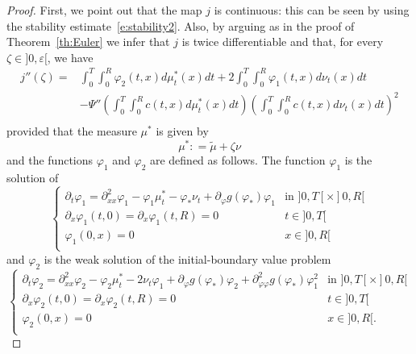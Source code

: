 \documentclass[11pt,leqno]{amsart}
\numberwithin{equation}{section}
\begin{document}
\begin{proof}
First, we point out that the map $j$ is continuous: this can be seen by using the stability estimate~\eqref{e:stability2}. Also, by arguing as in the proof of Theorem~\ref{th:Euler} we infer that $j$ is twice differentiable and that, 
for every $\zeta \in ]0, \varepsilon[$, we have 
\begin{equation}
    \begin{split}
    \label{e:jtwice}
             j''(\zeta) =          
            &
\int_0^T \! \! \int_0^R {\varphi}_2(t,x) d  \mu^\ast_t(x)dt+
2\int_0^T \! \!  \int_0^R {\varphi}_1(t,x) d\nu_t(x)dt\\
&-\Psi''\left(\int_0^T\int_0^R c(t,x)d\mu^\ast_t(x)dt\right)\left(\int_0^T \! \!  \int_0^R c(t,x)d\nu_t(x)dt\right)^2\\
\end{split}
    \end{equation}
provided that the measure $\mu^\ast$ is given by 
\begin{equation}
\label{e:cosaemuast}
    \mu^\ast : = \tilde \mu+ \zeta \nu 
\end{equation}
and the functions ${\varphi}_1$ and ${\varphi}_2$ are defined as follows. The function ${\varphi}_1$ 
is the solution of
\begin{equation}
\label{e:defhiuno}
\begin{cases}
{\partial_t} {\varphi}_1={\partial_{xx}^2} {\varphi}_1-{\varphi}_1 \mu^\ast_t- {\varphi}_\ast \nu_t+ \partial_{\varphi} g ( {\varphi}_\ast) {\varphi}_1  &
 \text{in $]0, T[ \times ]0, R[$}\\
{\partial_x } {\varphi}_1(t,0)={\partial_x } {\varphi}_1(t,R)=0 & t \in ]0, T[  \\
{\varphi}_1(0,x)=0 & x\in ]0,R[ \\
\end{cases}
\end{equation} and ${\varphi}_2$ is the weak solution of the initial-boundary value problem   
 \begin{equation}
\label{eq:Euler2}
\begin{cases}
{\partial_t}{\varphi}_2={\partial_{xx}^2} {\varphi}_2
-{\varphi}_2 \mu^\ast_t - 2 \nu_t {\varphi}_1 + \partial_{\varphi} g ( {\varphi}_\ast) {\varphi}_2 + \partial^2_{{\varphi} {\varphi}} g ({\varphi}_\ast) {\varphi}_1^2 
 &
 \text{in $]0, T[ \times ]0, R[$}\\
{\partial_x } {\varphi}_2(t,0)={\partial_x } {\varphi}_2(t,R)=0 & t \in ]0, T[  \\
{\varphi}_2(0,x)=0 & x\in ]0,R[. \\

\end{cases}
\end{equation}
\end{proof}
\end{document}
